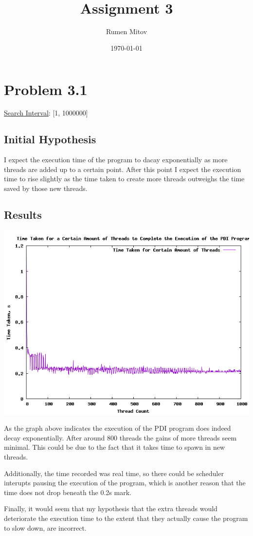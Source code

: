 \documentclass[11pt]{article}
\author{Rumen Mitov}
\date{\today}
\title{Assignment 3}
\begin{document}
\maketitle
\tableofcontents


\section{Problem 3.1}
\label{sec:org4627d90}
\uline{Search Interval}: [1, 1000000]

\subsection{Initial Hypothesis}
\label{sec:orgb65aee5}
I expect the execution time of the program to dacay exponentially as more threads are added up to a certain point. After this point I expect the execution time to rise slightly as the time taken to create more threads outweighs the time saved by those new threads.

\subsection{Results}
\label{sec:orga5f23fc}
\begin{center}
\includegraphics[width=.9\linewidth]{./assets/output.png}
\end{center}

As the graph above indicates the execution of the PDI program does indeed decay exponentially. After around 800 threads the gains of more threads seem minimal. This could be due to the fact that it takes time to spawn in new threads.

Additionally, the time recorded was real time, so there could be scheduler interupts pausing the execution of the program, which is another reason that the time does not drop beneath the 0.2s mark.

Finally, it would seem that my hypothesis that the extra threads would deteriorate the execution time to the extent that they actually cause the program to slow down, are incorrect.
\end{document}

